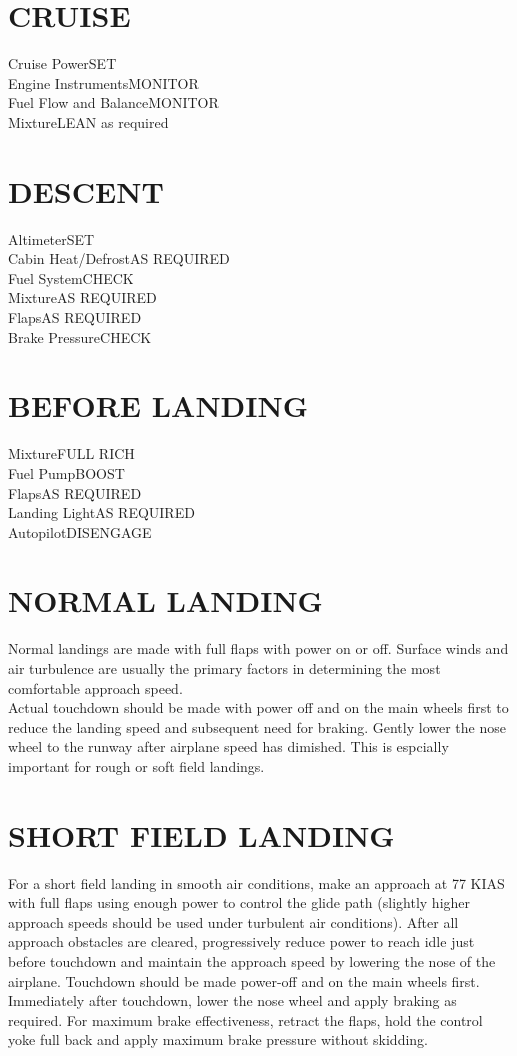 \documentclass{article}
\begin{document}
\begin{multicols*}{2}
\section*{CRUISE}
Cruise Power\dotfill SET\\
Engine Instruments\dotfill MONITOR\\
Fuel Flow and Balance\dotfill MONITOR\\
Mixture\dotfill LEAN as required
\section*{DESCENT}
Altimeter\dotfill SET\\
Cabin Heat/Defrost\dotfill AS REQUIRED\\
Fuel System\dotfill CHECK\\
Mixture\dotfill AS REQUIRED\\
Flaps\dotfill AS REQUIRED\\
Brake Pressure\dotfill CHECK
\section*{BEFORE LANDING}
Mixture\dotfill FULL RICH\\
Fuel Pump\dotfill BOOST\\
Flaps\dotfill AS REQUIRED\\
Landing Light\dotfill AS REQUIRED\\
Autopilot\dotfill DISENGAGE
\section*{NORMAL LANDING}
Normal landings are made with full flaps with power on or off. Surface winds and air turbulence are usually the primary factors in determining the most comfortable approach speed.\\
Actual touchdown should be made with power off and on the main wheels first to reduce the landing speed and subsequent need for braking. Gently lower the nose wheel to the runway after airplane speed has dimished. This is espcially important for rough or soft field landings.
\section*{SHORT FIELD LANDING}
For a short field landing in smooth air conditions, make an approach at 77 KIAS with full flaps using enough power to control the glide path (slightly higher approach speeds should be used under turbulent air conditions). After all approach obstacles are cleared, progressively reduce power to reach idle just before touchdown and maintain the approach speed by lowering the nose of the airplane. Touchdown should be made power-off and on the main wheels first. Immediately after touchdown, lower the nose wheel and apply braking as required. For maximum brake effectiveness, retract the flaps, hold the control yoke full back and apply maximum brake pressure without skidding.

\end{multicols*}
\end{document}
